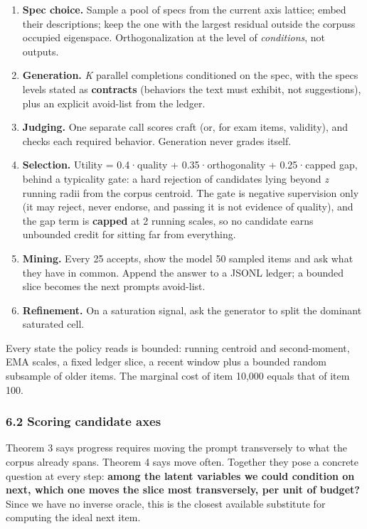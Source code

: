 \documentclass[
  10pt,
]{article}
\providecommand{\tightlist}{%
  \setlength{\itemsep}{0pt}\setlength{\parskip}{0pt}}
\theoremstyle{plain}
\theoremstyle{definition}
\providecommand{\tightlist}{\setlength{\itemsep}{0pt}\setlength{\parskip}{0pt}}
\begin{document}
\begin{enumerate}
\def\labelenumi{\arabic{enumi}.}
\tightlist
\item
  \textbf{Spec choice.} Sample a pool of specs from the current axis
  lattice; embed their descriptions; keep the one with the largest
  residual outside the corpus\textquotesingle s occupied eigenspace.
  Orthogonalization at the level of \emph{conditions}, not outputs.
\item
  \textbf{Generation.} \emph{K} parallel completions conditioned on the
  spec, with the spec\textquotesingle s levels stated as
  \textbf{contracts} (behaviors the text must exhibit, not suggestions),
  plus an explicit avoid-list from the ledger.
\item
  \textbf{Judging.} One separate call scores craft (or, for exam items,
  validity), and checks each required behavior. Generation never grades
  itself.
\item
  \textbf{Selection.} Utility = 0.4·quality + 0.35·orthogonality +
  0.25·capped gap, behind a typicality gate: a hard rejection of
  candidates lying beyond \emph{z} running radii from the corpus
  centroid. The gate is negative supervision only (it may reject, never
  endorse, and passing it is not evidence of quality), and the gap term
  is \textbf{capped} at 2 running scales, so no candidate earns
  unbounded credit for sitting far from everything.
\item
  \textbf{Mining.} Every 25 accepts, show the model 50 sampled items and
  ask what they have in common. Append the answer to a JSONL ledger; a
  bounded slice becomes the next prompts\textquotesingle{} avoid-list.
\item
  \textbf{Refinement.} On a saturation signal, ask the generator to
  split the dominant saturated cell.
\end{enumerate}

Every state the policy reads is bounded: running centroid and
second-moment, EMA scales, a fixed ledger slice, a recent window plus a
bounded random subsample of older items. The marginal cost of item
10,000 equals that of item 100.

\subsubsection{6.2 Scoring candidate
axes}\label{62-scoring-candidate-axes}

Theorem 3 says progress requires moving the prompt transversely to what
the corpus already spans. Theorem 4 says move often. Together they pose
a concrete question at every step: \textbf{among the latent variables we
could condition on next, which one moves the slice most transversely,
per unit of budget?} Since we have no inverse oracle, this is the
closest available substitute for computing the ideal next item.
\end{document}
